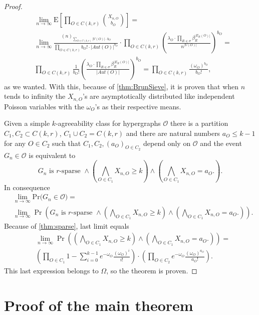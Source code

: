 \documentclass[12pt,notitlepage,a4paper]{article}
\theoremstyle{definition}
\newcommand{\Ln}{\lim\limits_{n\to \infty}}
\newcommand{\PR}[1]{\mathrm{Pr}\big(#1\big)}
\begin{document}
\begin{proof}
\begin{align*}
&\Ln \mathrm{E}\left[
\prod_{O\in C(k,r)}
\binom{X_{n,O}}{b_O}
\right]=\\
&
\Ln
\frac{(n)_{\sum_{O\in C(k,r)} |V(O)|\cdot b_O}}
{\prod_{O\in C(k,r)} b_O!\cdot |Aut(O)|^{b_O}} \cdot
\prod_{O\in C(k,r)}
\left( 
\frac{\lambda_O \cdot \prod_{R\in \sigma} \beta_R^{|E_R(O)|}}{n^{|V(O)|}}
\right)^{b_O} = \\
&\prod_{O\in C(k,r)} \frac{1}{b_O!}\left(\frac{\lambda_O  
\cdot \prod_{R\in \sigma} \beta_R^{|E_R(O)|} }{|Aut(O)|}
\right)^{b_O}= \prod_{O\in C(k,r)} 
\frac{(\omega_O)^{b_O}}{b_O!},
\end{align*}
as we wanted. With this, because of \cref{thm:BrunSieve}, it 
is proven that when $n$ tends to infinity
the $X_{n,O}$'s are asymptotically distributed 
like independent
Poisson variables with the $\omega_O$'s as their respective means.\par
Given a simple $k$-agreeability class for hypergraphs $\mathcal{O}$ there 
is a partition $C_1, C_2\subset C(k,r)$, $C_1\cup C_2=C(k,r)$ 
and there are natural numbers $a_O\leq k-1$ for any $O\in C_2$ such that
$C_1, C_2, (a_O)_{O\in C_2}$ depend only on $\mathcal{O}$ and
the event $G_n\in \mathcal{O}$ is equivalent to
\[
G_n \text{ is $r$-sparse } \wedge
\left(
 \bigwedge_{O\in C_1}
 X_{n,O}\geq k
\right)
\wedge
\left(
\bigwedge_{O\in C_1}
X_{n,O}=a_O.
\right).
\]
In consequence
\begin{align*}
 & \Ln
 \PR{G_n \in \mathcal{O}}=\\
 &\Ln
 \Pr \left(
 G_n \text{ is $r$-sparse } \wedge
 \left(
 \bigwedge_{O\in C_1}
 X_{n,O}\geq k
 \right)
 \wedge
 \left(
 \bigwedge_{O\in C_1}
 X_{n,O}=a_O.
 \right)
 \right).
\end{align*}
Because of \cref{thm:sparse}, last limit equals
\begin{align*}
&\Ln
\Pr \left(
\left(
\bigwedge_{O\in C_1}
X_{n,O}\geq k
\right)
\wedge
\left(
\bigwedge_{O\in C_1}
X_{n,O}=a_O.
\right)
\right)
=\\
&
\left(
\prod_{O\in C_1}
1-\sum_{i=0}^{k-1} e^{-\omega_O}\frac{(\omega_O)^i}{i!}
\right)
\cdot
\left(
\prod_{O\in C_2}
e^{-\omega_O}\frac{(\omega_O)^{a_O}}{a_O!}
\right)
.
\end{align*}
This last expression belongs to $\Omega$, so the theorem is proven. 
\end{proof}

\section{Proof of the main theorem}
\end{document}
